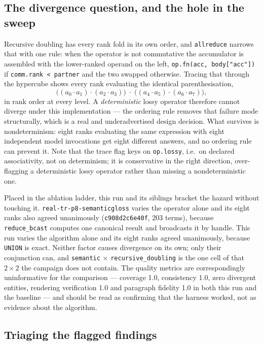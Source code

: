 \documentclass[11pt]{article}
\begin{document}
\subsection*{The divergence question, and the hole in the sweep}

Recursive doubling has every rank fold in its own order, and \texttt{allreduce} narrows that with
one rule: when the operator is not commutative the accumulator is assembled with the
lower-ranked operand on the left, \texttt{op.fn(acc, body["acc"])} if
\texttt{comm.rank < partner} and the two swapped otherwise. Tracing that through the hypercube
shows every rank evaluating the identical parenthesisation,
\[
\big((a_0\!\cdot\!a_1)\!\cdot\!(a_2\!\cdot\!a_3)\big)\;\cdot\;\big((a_4\!\cdot\!a_5)\!\cdot\!(a_6\!\cdot\!a_7)\big),
\]
in rank order at every level. A \emph{deterministic} lossy operator therefore cannot diverge under
this implementation --- the ordering rule removes that failure mode structurally, which is a real
and underadvertised design decision. What survives is nondeterminism: eight ranks evaluating the
same expression with eight independent model invocations get eight different answers, and no
ordering rule can prevent it. Note that the trace flag keys on \texttt{op.lossy}, i.e.\ on declared
associativity, not on determinism; it is conservative in the right direction, over-flagging a
deterministic lossy operator rather than missing a nondeterministic one.

Placed in the ablation ladder, this run and its siblings bracket the hazard without touching it.
\texttt{real-tr-p8-semanticgloss} varies the operator alone and its eight ranks also agreed
unanimously (\texttt{c908d2c6e40f}, 203 terms), because \texttt{reduce\_bcast} computes one
canonical result and broadcasts it by handle. This run varies the algorithm alone and its eight
ranks agreed unanimously, because \texttt{UNION} is exact. Neither factor causes divergence on its
own; only their conjunction can, and \texttt{semantic} $\times$ \texttt{recursive\_doubling} is the
one cell of that $2\times2$ the campaign does not contain. The quality metrics are correspondingly
uninformative for the comparison --- coverage 1.0, consistency 1.0, zero divergent entities,
rendering verification 1.0 and paragraph fidelity 1.0 in both this run and the baseline --- and
should be read as confirming that the harness worked, not as evidence about the algorithm.

\subsection*{Triaging the flagged findings}
\end{document}
